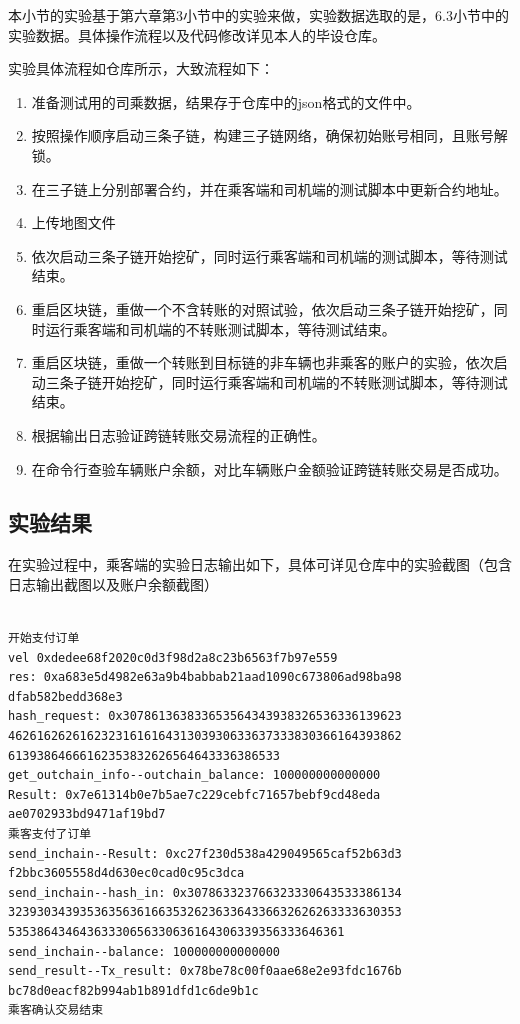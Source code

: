 本小节的实验基于第六章第3小节中的实验来做，实验数据选取的是，6.3小节中的实验数据。具体操作流程以及代码修改详见本人的毕设仓库。

实验具体流程如仓库所示，大致流程如下：

\begin{enumerate}
    \item 准备测试用的司乘数据，结果存于仓库中的json格式的文件中。
    \item 按照操作顺序启动三条子链，构建三子链网络，确保初始账号相同，且账号解锁。
    \item 在三子链上分别部署合约，并在乘客端和司机端的测试脚本中更新合约地址。
    \item 上传地图文件
    \item 依次启动三条子链开始挖矿，同时运行乘客端和司机端的测试脚本，等待测试结束。
    \item 重启区块链，重做一个不含转账的对照试验，依次启动三条子链开始挖矿，同时运行乘客端和司机端的不转账测试脚本，等待测试结束。
    \item 重启区块链，重做一个转账到目标链的非车辆也非乘客的账户的实验，依次启动三条子链开始挖矿，同时运行乘客端和司机端的不转账测试脚本，等待测试结束。
    \item 根据输出日志验证跨链转账交易流程的正确性。
    \item 在命令行查验车辆账户余额，对比车辆账户金额验证跨链转账交易是否成功。
\end{enumerate}

\subsection{实验结果}

在实验过程中，乘客端的实验日志输出如下，具体可详见仓库中的实验截图（包含日志输出截图以及账户余额截图）

\begin{verbatim}

开始支付订单
vel 0xdedee68f2020c0d3f98d2a8c23b6563f7b97e559
res: 0xa683e5d4982e63a9b4babbab21aad1090c673806ad98ba98
dfab582bedd368e3
hash_request: 0x307861363833653564343938326536336139623
4626162626162323161616431303930633637333830366164393862
61393864666162353832626564643336386533
get_outchain_info--outchain_balance: 100000000000000
Result: 0x7e61314b0e7b5ae7c229cebfc71657bebf9cd48eda
ae0702933bd9471af19bd7
乘客支付了订单
send_inchain--Result: 0xc27f230d538a429049565caf52b63d3
f2bbc3605558d4d630ec0cad0c95c3dca
send_inchain--hash_in: 0x307863323766323330643533386134
3239303439353635636166353262363364336632626263333630353
53538643464363330656330636164306339356333646361
send_inchain--balance: 100000000000000
send_result--Tx_result: 0x78be78c00f0aae68e2e93fdc1676b
bc78d0eacf82b994ab1b891dfd1c6de9b1c
乘客确认交易结束

\end{verbatim}

